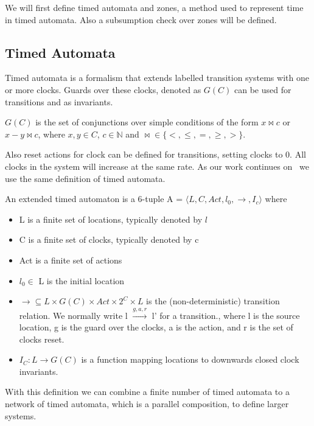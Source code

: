 We will first define timed automata and zones, a method used to represent time in timed automata. Also a subsumption check over zones will be defined. 

\subsection{Timed Automata}
Timed automata is a formalism that extends labelled transition systems with one or more clocks. Guards over these clocks, denoted as $G(C)$ can be used for transitions and as invariants. 

\begin{mydef}
\label{def:clockGuards}
$G(C)$ is the set of conjunctions over simple conditions of the form $x \Join c$ or $x-y \Join c$, where $x,y \in C$, $c \in \mathbb{N}$ and $\Join \in \{<,\leq,=,\geq,>\}$.
\end{mydef}

Also reset actions for clock can be defined for transitions, setting clocks to $0$. All clocks in the system will increase at the same rate. As our work continues on~\cite{eemcs21972} we use the same definition of timed automata.

\begin{mydef}
\label{def:TA}
An extended timed automaton is a 6-tuple A = $\langle L, C, Act, l_0, \rightarrow, I_c\rangle$ where
{\renewcommand\labelitemi{--}
	\begin{itemize}
		\item L is a finite set of locations, typically denoted by $l$
		\item C is a finite set of clocks, typically denoted by c
		\item Act is a finite set of actions
		\item $l_0 \in$ L is the initial location
		\item $\rightarrow \subseteq L \times G(C) \times Act \times 2^C \times L$ is the (non-deterministic) transition relation. We normally write l $\stackrel{g,a,r}{\longrightarrow}$ l' for a transition., where l is the source location, g is the guard over the clocks, a is the action, and r is the set of clocks reset.
		\item $I_C : L \rightarrow G(C)$ is a function mapping locations to downwards closed clock invariants.
	\end{itemize}
}
\end{mydef}

With this definition we can combine a finite number of timed automata to a network of timed automata, which is a parallel composition, to define larger systems.

